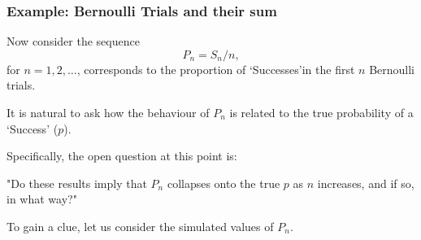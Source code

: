 \documentclass[notes=show,smaller,handout]{beamer}\usepackage[]{graphicx}\usepackage[]{color}
\newenvironment{stepitemize}{\begin{itemize}[<+->]}{\end{itemize} }
\begin{document}
\begin{frame}%

\frametitle{Example: Bernoulli Trials and their sum}


Now consider the sequence
$${P}_n=S_n/n,$$
for $n=1,2,\ldots$, corresponds to the proportion of `Successes'in the first $n$ Bernoulli trials.
\vspace{0.4cm}


It is natural to ask how the behaviour of  ${P}_n$ is related to the true probability of a `Success' ($p$).
\vspace{0.4cm}


Specifically, the open question at this point is: \\
\vspace{0.3cm}
\begin{center}
\color{red} "Do these results imply that ${P}_n$ collapses onto the true $p$ as $n$ increases, and if
so, in what way?"  \color{black} \\ \vspace{0.3cm}
\end{center}
To gain a clue, let us consider the simulated values of ${P}_n$.

\end{frame}%
\end{document}
